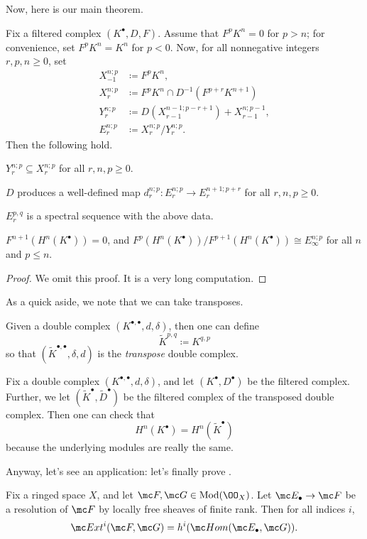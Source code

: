 \documentclass[../notes.tex]{subfiles}
\begin{document}
Now, here is our main theorem.
\begin{theorem} \label{thm:get-spectral-sequence}
	Fix a filtered complex $(K^\bullet,D,F)$. Assume that $F^pK^n=0$ for $p>n$; for convenience, set $F^pK^n=K^n$ for $p<0$. Now, for all nonnegative integers $r,p,n\ge0$, set
	\begin{align*}
		X_{-1}^{n;p} &\coloneqq F^pK^n, \\
		X_r^{n;p} &\coloneqq F^pK^n\cap D^{-1}\left(F^{p+r}K^{n+1}\right) \\
		Y_r^{n;p} &\coloneqq D\left(X^{n-1;p-r+1}_{r-1}\right)+X_{r-1}^{n;p-1}, \\
		E_r^{n;p} &\coloneqq X_r^{n;p}/Y_r^{n;p}.
	\end{align*}
	Then the following hold.
	\begin{listalph}
		\item $Y_r^{n;p}\subseteq X_r^{n;p}$ for all $r,n,p\ge0$.
		\item $D$ produces a well-defined map $d_r^{n;p}\colon E_r^{n;p}\to E_r^{n+1;p+r}$ for all $r,n,p\ge0$.
		\item $E_r^{p,q}$ is a spectral sequence with the above data.
		\item $F^{n+1}(H^n(K^\bullet))=0$, and $F^p(H^n(K^\bullet))/F^{p+1}(H^n(K^\bullet))\cong E_\infty^{n;p}$ for all $n$ and $p\le n$.
	\end{listalph}
\end{theorem}
\begin{proof}
	We omit this proof. It is a very long computation.
\end{proof}
As a quick aside, we note that we can take transposes.
\begin{definition}[transpose]
	Given a double complex $(K^{\bullet,\bullet},d,\delta)$, then one can define
	\[\widetilde K^{p,q}\coloneqq K^{q,p}\]
	so that $(\widetilde K^{\bullet,\bullet},\delta,d)$ is the \textit{transpose} double complex.
\end{definition}
\begin{remark}
	Fix a double complex $(K^{\bullet,\bullet},d,\delta)$, and let $(K^\bullet,D^\bullet)$ be the filtered complex. Further, we let $(\widetilde K^\bullet,\widetilde D^\bullet)$ be the filtered complex of the transposed double complex. Then one can check that
	\[H^n(K^\bullet)=H^n(\widetilde K^\bullet)\]
	because the underlying modules are really the same.
\end{remark}
Anyway, let's see an application: let's finally prove .
\begin{proposition}
	Fix a ringed space $X$, and let $\mc F,\mc G\in\mathrm{Mod}(\OO_X)$. Let $\mc E_\bullet\to\mc F$ be a resolution of $\mc F$ by locally free sheaves of finite rank. Then for all indices $i$,
	\[\mc Ext^i(\mc F,\mc G)=h^i(\mc Hom(\mc E_\bullet,\mc G)).\]
\end{proposition}
\end{document}
